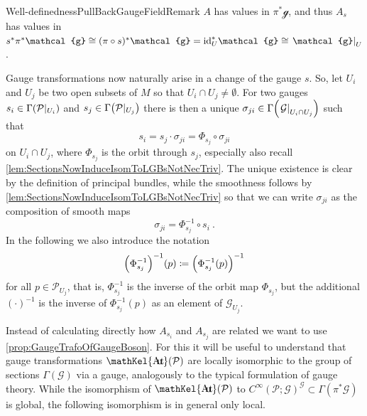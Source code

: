 \documentclass[reqno,a4paper,oneside]{amsart}
\theoremstyle{plain}
\theoremstyle{remark}
\theoremstyle{definition}
\def\bas#1\eas{\begin{align*}#1\end{align*}}
\DeclareMathOperator{\sAut}{\mathKel{A\mkern-5.5mu u\mkern-4mu t\mkern-1.5mu}}
\begin{document}
\begin{remarks}{Well-definedness}{PullBackGaugeFieldRemark}
$A$ has values in $\pi^*\mathcal{g}$, and thus $A_s$ has values in $s^*\pi^*\mathcal{g} \cong (\pi \circ s)^*\mathcal{g} = \mathrm{id}_U^*\mathcal{g} \cong \mleft.\mathcal{g}\mright|_U$.
\end{remarks}

Gauge transformations now naturally arise in a change of the gauge $s$. So, let $U_i$ and $U_j$ be two open subsets of $M$ so that $U_i \cap U_j \neq \emptyset$. For two gauges $s_i \in \Gamma\mleft(\mathcal{P}|_{U_i}\mright)$ and $s_j \in \Gamma\mleft(\mathcal{P}|_{U_j}\mright)$ there is then a unique $\sigma_{ji} \in \Gamma\mleft( \mleft.\mathcal{G}\mright|_{U_i \cap U_j} \mright)$ such that
\begin{equation*}
s_i
=
s_j \cdot \sigma_{ji}
=
\Phi_{s_j} \circ \sigma_{ji}
\end{equation*}
on $U_i \cap U_j$,
where $\Phi_{s_j}$ is the orbit through $s_j$, especially also recall \ref{lem:SectionsNowInduceIsomToLGBsNotNecTriv}.
The unique existence is clear by the definition of principal bundles, while the smoothness follows by \ref{lem:SectionsNowInduceIsomToLGBsNotNecTriv} so that we can write $\sigma_{ji}$ as the composition of smooth maps
\begin{equation*}
\sigma_{ji}
=
\Phi^{-1}_{s_j} \circ s_i~.
\end{equation*}
In the following we also introduce the notation
\begin{equation*}
\mleft(\Phi^{-1}_{s_j}\mright)^{-1}(p)
\coloneqq
\mleft(\Phi^{-1}_{s_j}(p)\mright)^{-1}
\end{equation*}
for all $p \in \mathcal{P}_{U_j}$, that is, $\Phi^{-1}_{s_j}$ is the inverse of the orbit map $\Phi_{s_j}$, but the additional $(\cdot)^{-1}$ is the inverse of $\Phi^{-1}_{s_j}(p)$ as an element of $\mathcal{G}_{U_j}$.

Instead of calculating directly how $A_{s_i}$ and $A_{s_j}$ are related we want to use \ref{prop:GaugeTrafoOfGaugeBoson}. For this it will be useful to understand that gauge transformations $\sAut(\mathcal{P})$ are locally isomorphic to the group of sections $\Gamma(\mathcal{G})$ via a gauge, analogously to the typical formulation of gauge theory. While the isomorphism of $\sAut(\mathcal{P})$ to $C^\infty(\mathcal{P};\mathcal{G})^{\mathcal{G}} \subset \Gamma(\pi^*\mathcal{G})$ is global, the following isomorphism is in general only local.
%
\end{document}
